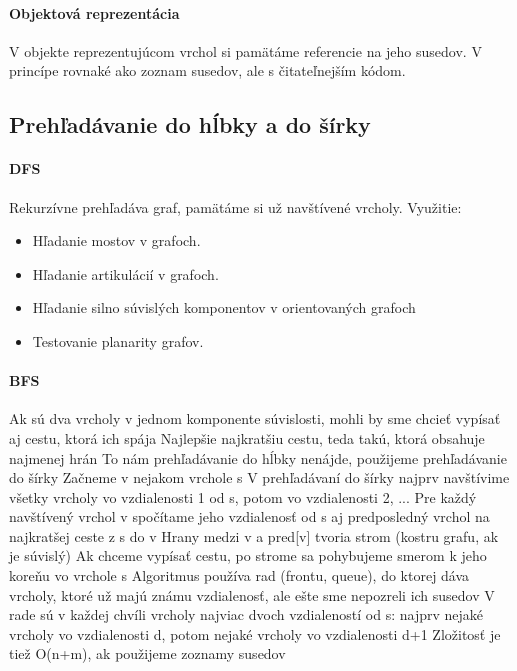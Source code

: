 		\paragraph{Objektová reprezentácia}
		V objekte reprezentujúcom vrchol si pamätáme referencie na jeho susedov. V princípe rovnaké ako zoznam susedov, ale s čitateľnejším kódom.

	\subsection{Prehľadávanie do hĺbky a do šírky}
		\paragraph{DFS}
			Rekurzívne prehľadáva graf, pamätáme si už navštívené vrcholy.
			Využitie: 
			\begin{itemize}
				\item Hľadanie mostov v grafoch.
				\item Hľadanie artikulácií v grafoch.
				\item Hľadanie silno súvislých komponentov v orientovaných grafoch
				\item Testovanie planarity grafov.
			\end{itemize}


		\paragraph{BFS}



Ak sú dva vrcholy v jednom komponente súvislosti, mohli by sme chcieť vypísať aj cestu, ktorá ich spája
Najlepšie najkratšiu cestu, teda takú, ktorá obsahuje najmenej hrán
To nám prehľadávanie do hĺbky nenájde, použijeme prehľadávanie do šírky
Začneme v nejakom vrchole s
V prehľadávaní do šírky najprv navštívime všetky vrcholy vo vzdialenosti 1 od s, potom vo vzdialenosti 2, ...
Pre každý navštívený vrchol v spočítame jeho vzdialenosť od s aj predposledný vrchol na najkratšej ceste z s do v
Hrany medzi v a pred[v] tvoria strom (kostru grafu, ak je súvislý)
Ak chceme vypísať cestu, po strome sa pohybujeme smerom k jeho koreňu vo vrchole s
Algoritmus používa rad (frontu, queue), do ktorej dáva vrcholy, ktoré už majú známu vzdialenosť, ale ešte sme nepozreli ich susedov
V rade sú v každej chvíli vrcholy najviac dvoch vzdialeností od s: najprv nejaké vrcholy vo vzdialenosti d, potom nejaké vrcholy vo vzdialenosti d+1
Zložitosť je tiež O(n+m), ak použijeme zoznamy susedov




